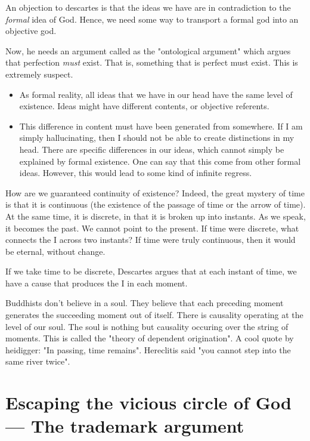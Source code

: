 \documentclass[11pt]{book}
\begin{document}
An objection to descartes is that the ideas we have are in contradiction to the
\textit{formal} idea of God. Hence, we need some way to transport a formal god
into an objective god.

Now, he needs an argument called as the "ontological argument" which argues
that perfection \textit{must} exist.  That is, something that is perfect must
exist. This is extremely suspect.

\begin{itemize}
    \item As formal reality, all ideas that we have in our head have the same
    level of existence.  Ideas might have different contents, or objective
    referents.  
    
    \item This difference in content must have been generated from
    somewhere. If I am simply hallucinating, then I should not be able to
    create distinctions in my head.  There are specific differences in our
    ideas, which cannot simply be explained by formal existence. One can say
    that this come from other formal ideas. However, this would lead to some
    kind of infinite regress.
\end{itemize}


How are we guaranteed continuity of existence? Indeed, the great mystery of
time is that it is continuous (the existence of the passage of time or the
arrow of time).  At the same time, it is discrete,  in that it is broken up
into instants. As we speak, it becomes the past. We cannot point to the
present. If time were discrete, what connects the I across two instants?
If time were truly continuous, then it would be eternal, without change.


If we take time to be discrete, Descartes argues that at each instant of time,
we have a cause that produces the I in each moment. 

Buddhists don't believe in a soul. They believe that each preceding moment 
generates the succeeding moment out of itself. There is causality operating
at the level of our soul. The soul is nothing but causality occuring over
the string of moments. This is called the "theory of dependent origination".
A cool quote by heidigger: "In passing, time remains". Hereclitis said "you
cannot step into the same river twice".


\section{Escaping the vicious circle of God --- The trademark argument}
\end{document}
